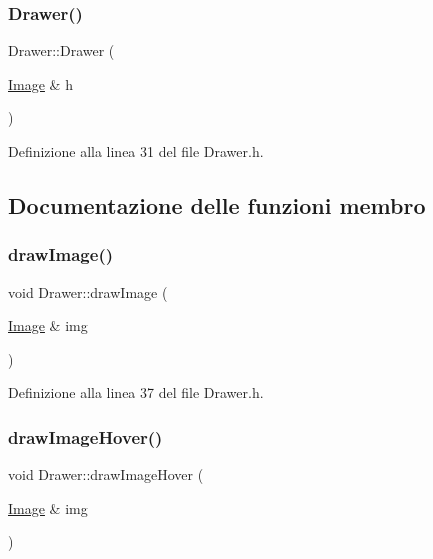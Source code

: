 \subsubsection{\texorpdfstring{Drawer()}{Drawer()}}
{\footnotesize\ttfamily Drawer\+::\+Drawer (\begin{DoxyParamCaption}\item[{\hyperlink{class_image}{Image} \&}]{h }\end{DoxyParamCaption})\hspace{0.3cm}{\ttfamily [inline]}}



Definizione alla linea 31 del file Drawer.\+h.



\subsection{Documentazione delle funzioni membro}
\mbox{\label{class_drawer_adeaa9f61868ca65d08ba253ac46e681d}} 
\subsubsection{\texorpdfstring{draw\+Image()}{drawImage()}}
{\footnotesize\ttfamily void Drawer\+::draw\+Image (\begin{DoxyParamCaption}\item[{\hyperlink{class_image}{Image} \&}]{img }\end{DoxyParamCaption})\hspace{0.3cm}{\ttfamily [inline]}}



Definizione alla linea 37 del file Drawer.\+h.

\mbox{\label{class_drawer_a83003fc88078355f22d868a29954da7d}} 
\subsubsection{\texorpdfstring{draw\+Image\+Hover()}{drawImageHover()}}
{\footnotesize\ttfamily void Drawer\+::draw\+Image\+Hover (\begin{DoxyParamCaption}\item[{\hyperlink{class_image}{Image} \&}]{img }\end{DoxyParamCaption})\hspace{0.3cm}{\ttfamily [inline]}}



